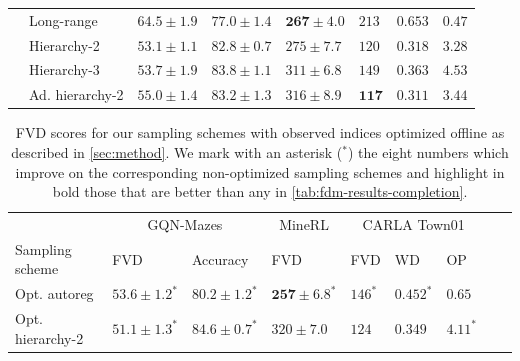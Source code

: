 \begin{table}
\begin{tabular}{llllllll}
    &  Long-range           & $64.5\pm1.9$            & $77.0 \pm 1.4$   & $\mathbf{267 \pm 4.0}$     & $213$          & $0.653$      & $\mathbf{0.47}$     \\
    &  Hierarchy-2          & $\mathbf{53.1 \pm 1.1}$ & $82.8 \pm 0.7$   & $275 \pm 7.7$        & $120$     & $0.318$  &  $3.28$      \\
    &  Hierarchy-3          & $53.7 \pm 1.9$          & $\mathbf{83.8 \pm 1.1}$   & $311 \pm 6.8$        & $149$      & $0.363$    &  $4.53$  \\
    &  Ad. hierarchy-2      & $55.0 \pm 1.4$          & $83.2 \pm 1.3$   & $316 \pm 8.9$    & $\mathbf{117}$          & $\mathbf{0.311}$     & $3.44$    \\
    \bottomrule
  \end{tabular}
\end{table}

\begin{table} %
  \small
  \caption{FVD scores for our sampling schemes with observed indices optimized offline as described in \cref{sec:method}.  We mark with an asterisk ($^*$) the eight numbers which improve on the corresponding non-optimized sampling schemes and highlight in bold those that are better than any in \cref{tab:fdm-results-completion}.}
  \vspace{2mm}
  \label{tab:fdm-optimized}
  \centering
  \begin{tabular}{lllllllll}
    \toprule
     & \multicolumn{2}{c}{GQN-Mazes}  & \multicolumn{1}{c}{MineRL}  & \multicolumn{3}{c}{CARLA Town01} \\
    \cmidrule(r){2-3} \cmidrule(r){4-4} \cmidrule(r){5-7}
    Sampling scheme       & FVD     & Accuracy    &    FVD & FVD & WD & OP \\
    \midrule
    Opt. autoreg        & $53.6 \pm 1.2^*$            & $80.2 \pm 1.2^*$            & $\mathbf{257 \pm 6.8}^*$    &   $146^*$ & $0.452^*$ & $0.65$   \\
    Opt. hierarchy-2   & $\mathbf{51.1 \pm 1.3}^*$    & $\mathbf{84.6 \pm 0.7}^*$   & $320 \pm 7.0$    &   $124$ & $0.349$ & $4.11^*$   \\
    \bottomrule
  \end{tabular}
\end{table}

